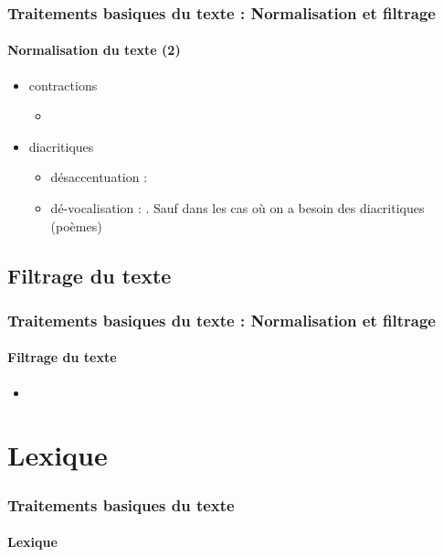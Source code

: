 \documentclass[xcolor=table]{beamer}
\begin{document}
\begin{frame}
\frametitle{Traitements basiques du texte : Normalisation et filtrage}
\framesubtitle{Normalisation du texte (2)}

\begin{itemize}
	
	\item contractions
	\begin{itemize}
		\item {}
	\end{itemize}
	
	\item diacritiques
	\begin{itemize}
		\item désaccentuation :  
		\item dé-vocalisation :  . Sauf dans les cas où on a besoin des diacritiques (poèmes)
	\end{itemize}
	
\end{itemize}

\end{frame}

\subsection{Filtrage du texte}

\begin{frame}
\frametitle{Traitements basiques du texte : Normalisation et filtrage}
\framesubtitle{Filtrage du texte}

\begin{itemize}
\item 
\end{itemize}

\end{frame}

\section{Lexique}

\begin{frame}
\frametitle{Traitements basiques du texte}
\framesubtitle{Lexique}


\end{frame}
\end{document}
